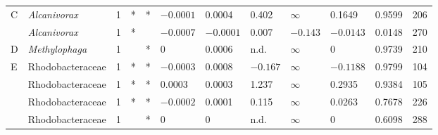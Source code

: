 \begin{landscape}
\begin{table}
\begin{tabular}{*{12}{l}}
C & \textit{Alcanivorax} & 1 & * & * & $-0.0001$ & 0.0004 & 0.402 & $\infty$ & 0.1649 & 0.9599 & 206 \\
 & \textit{Alcanivorax} & 1 & * &  & $-0.0007$ & $-0.0001$ & 0.007 & $-0.143$ & $-0.0143$ & 0.0148 & 270 \\
D & \textit{Methylophaga} & 1 &  & * & 0 & 0.0006 & n.d. & $\infty$ & 0 & 0.9739 & 210 \\
E & Rhodobacteraceae & 1 & * & * & $-0.0003$ & 0.0008 & $-0.167$ & $\infty$ & $-0.1188$ & 0.9799 & 104 \\
 & Rhodobacteraceae & 1 & * & * & 0.0003 & 0.0003 & 1.237 & $\infty$ & 0.2935 & 0.9384 & 105 \\
 & Rhodobacteraceae & 1 & * & * & $-0.0002$ & 0.0001 & 0.115 & $\infty$ & 0.0263 & 0.7678 & 226 \\
 & Rhodobacteraceae & 1 &  & * & 0 & 0 & n.d. & $\infty$ & 0 & 0.6098 & 288 \\
\bottomrule
\end{tabular}
\end{table}
\end{landscape}

